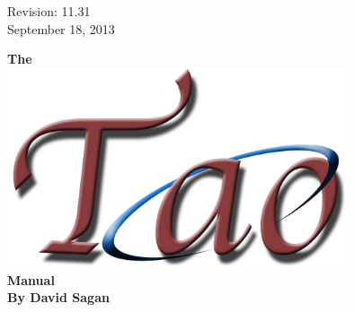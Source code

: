 \thispagestyle{empty}

\begin{flushright}
\large
  Revision: 11.31 \\
  September 18, 2013 \\
\end{flushright}

\vfill


{
\begin{center}
{\Huge \sf\bf The} \\
\vskip 0.1in
\includegraphics[width=10cm]{tao-logo.pdf} \\
\vskip 0.1in
{\Huge \sf\bf Manual} \\
\vskip 0.4in
{\Large \sf\bf By David Sagan} \\
\end{center}
}

\vfill
\break
